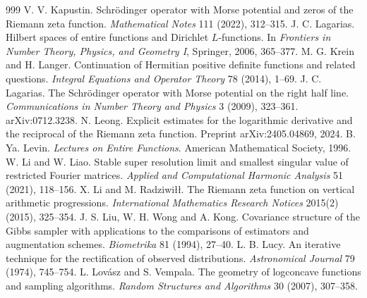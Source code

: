 \begin{thebibliography}{999}
 V. V. Kapustin. Schr\"odinger operator with Morse potential and zeros of the Riemann zeta function. \emph{Mathematical Notes} 111 (2022), 312--315.
 J. C. Lagarias. Hilbert spaces of entire functions and Dirichlet $L$-functions. In \emph{Frontiers in Number Theory, Physics, and Geometry I}, Springer, 2006, 365--377.
 M. G. Krein and H. Langer. Continuation of Hermitian positive definite functions and related questions. \emph{Integral Equations and Operator Theory} 78 (2014), 1--69.
 J. C. Lagarias. The Schr\"odinger operator with Morse potential on the right half line. \emph{Communications in Number Theory and Physics} 3 (2009), 323--361. arXiv:0712.3238.
 N. Leong. Explicit estimates for the logarithmic derivative and the reciprocal of the Riemann zeta function. Preprint arXiv:2405.04869, 2024.
 B. Ya. Levin. \emph{Lectures on Entire Functions}. American Mathematical Society, 1996.
 W. Li and W. Liao. Stable super resolution limit and smallest singular value of restricted Fourier matrices. \emph{Applied and Computational Harmonic Analysis} 51 (2021), 118--156.
 X. Li and M. Radziwi\l\l. The Riemann zeta function on vertical arithmetic progressions. \emph{International Mathematics Research Notices} 2015(2) (2015), 325--354.
 J. S. Liu, W. H. Wong and A. Kong. Covariance structure of the Gibbs sampler with applications to the comparisons of estimators and augmentation schemes. \emph{Biometrika} 81 (1994), 27--40.
 L. B. Lucy. An iterative technique for the rectification of observed distributions. \emph{Astronomical Journal} 79 (1974), 745--754.
 L. Lov\'asz and S. Vempala. The geometry of logconcave functions and sampling algorithms. \emph{Random Structures and Algorithms} 30 (2007), 307--358.

\end{thebibliography}
